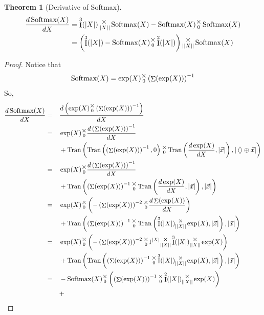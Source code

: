 \documentclass[12pt]{book}
\theoremstyle{plain}
\newtheorem{theorem}{Theorem}[chapter]
\theoremstyle{definition}
\theoremstyle{ppart}
\theoremstyle{case}
\theoremstyle{solution}
\DeclareMathOperator{\Ident}{I}
\DeclareMathOperator{\Tran}{Tran}
\DeclareMathOperator{\Softmax}{Softmax}
\DeclareMathOperator{\Sum}{\Sigma}
\newcommand{\mmult}[1]{\text{\raisebox{1ex}{$\underset{#1}{\times}$}}}
\begin{document}
\begin{landscape}
\begin{theorem}[Derivative of Softmax]
\label{softmax_derivative}
\begin{align*}
	\frac{d\Softmax(X)}{dX}
	&=
	\Ident^3(|X|) \mmult{||X||} \Softmax(X)
  -\Softmax(X) \mmult{0} \Softmax(X) \\
	&=
	\left(\Ident^3(|X|) - \Softmax(X) \mmult{0} \Ident^2(|X|) \right)
	\mmult{||X||} \Softmax(X)
\end{align*}
\end{theorem}
\begin{proof}
Notice that 
\[
	\Softmax(X) = \exp(X) \mmult{0} \left( \Sum(\exp(X)) \right)^{-1}
\]
So,
\begin{alignat}{3}
	\frac{d\Softmax(X)}{dX}
	&=&&
	\frac{d \left( \exp(X) \mmult{0} \left( \Sum(\exp(X)) \right)^{-1} \right)}{dX} \\
	&=&&
	\exp(X) \mmult{0} \frac{d \left( \Sum(\exp(X)) \right)^{-1}}{dX}
	\nonumber\\&&&+
	\Tran\left(
		\Tran\left(
			\left( \Sum(\exp(X)) \right)^{-1}
			,0
		\right)
		\mmult{0}
		\Tran\left(
			\frac{d \exp(X)}{dX}
			,|\vec{x}|
		\right)
		,|\left<\right> \oplus \vec{x}|
	\right) \\
	&=&&
	\exp(X) \mmult{0} \frac{d \left( \Sum(\exp(X)) \right)^{-1}}{dX}
	\nonumber\\&&&+
	\Tran\left(
		\left( \Sum(\exp(X)) \right)^{-1}
		\mmult{0}
		\Tran\left(
			\frac{d \exp(X)}{dX}
			,|\vec{x}|
		\right)
		,|\vec{x}|
	\right) \\
	&=&&
	\exp(X) \mmult{0} \left(
		-\left( \Sum(\exp(X)) \right)^{-2}
		\mmult{0}
		\frac{d\Sum(\exp(X))}{dX}
	\right)
	\nonumber\\&&&+
	\Tran\left(
		\left( \Sum(\exp(X)) \right)^{-1}
		\mmult{0}
		\Tran\left(
			\Ident^3(|X|) \mmult{||X||} \exp(X)
			,|\vec{x}|
		\right)
		,|\vec{x}|
	\right) \\
	&=&&
	\exp(X) \mmult{0} \left(
		-\left( \Sum(\exp(X)) \right)^{-2}
		\mmult{0}
		1^{|X|}
		\mmult{||X||}
		\Ident^3(|X|)
		\mmult{||X||}
		\exp(X)
	\right)
	\nonumber\\&&&+
	\Tran\left(
		\Tran\left(
			\left( \Sum(\exp(X)) \right)^{-1}
			\mmult{0}
			\Ident^3(|X|) \mmult{||X||} \exp(X)
		,|\vec{x}|
		\right)
		,|\vec{x}|
	\right) \\
	&=&&
	-\Softmax(X) \mmult{0} \left(
		\left( \Sum(\exp(X)) \right)^{-1}
		\mmult{0}
		\Ident^2(|X|)
		\mmult{||X||}
		\exp(X)
	\right)
	\nonumber\\&&&+

\end{alignat}
\end{proof}
\end{landscape}
\end{document}
